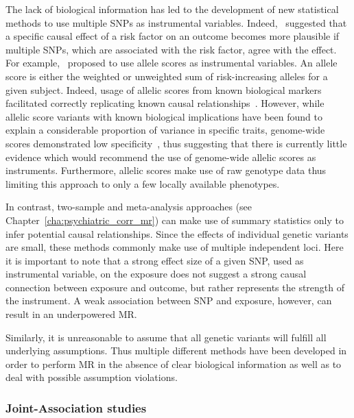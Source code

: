 The lack of biological information has led to the development of new statistical methods to use multiple SNPs as instrumental variables. 
Indeed,~\citet{Burgess2016a} suggested that a specific causal effect of a risk factor on an outcome becomes more plausible if multiple SNPs, which are associated with the risk factor, agree with the effect.
For example,~\citet{Burgess2013} proposed to use allele scores as instrumental variables.
An allele score is either the weighted or unweighted sum of risk-increasing alleles for a given subject.
Indeed, usage of allelic scores from known biological markers facilitated correctly replicating known causal relationships~\cite{Timpson2005,CReactiveProteinCoronaryHeartDiseaseGeneticsCollaborationCCGC2011}.
However, while allelic score variants with known biological implications have been found to explain a considerable proportion of variance in specific traits, genome-wide scores demonstrated low specificity~\cite{Evans2013},
thus suggesting that there is currently little evidence which would recommend the use of genome-wide allelic scores as instruments.
Furthermore, allelic scores make use of raw genotype data thus limiting this approach to only a few locally available phenotypes.

In contrast, two-sample and meta-analysis approaches (see Chapter~\ref{cha:psychiatric_corr_mr}) can make use of summary statistics only to infer potential causal relationships. 
Since the effects of individual genetic variants are small, these methods commonly make use of multiple independent loci.
Here it is important to note that a strong effect size of a given SNP, used as instrumental variable, on the exposure does not suggest a strong causal connection between exposure and outcome, but rather represents the strength of the instrument.
A weak association between SNP and exposure, however, can result in an underpowered MR\@.

Similarly, it is unreasonable to assume that all genetic variants will fulfill all underlying assumptions.
Thus multiple different methods have been developed in order to perform MR in the absence of clear biological information as well as to deal with possible assumption violations.

\subsubsection{Joint-Association studies}
\label{ssub:sensitivity_analysis}

